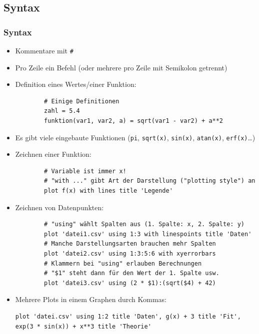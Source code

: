 \subsection{Syntax}

\begin{frame}[<+->][fragile]
	\frametitle{Syntax}
	\begin{itemize}
		\item Kommentare mit \lstinline|#|
		\item Pro Zeile ein Befehl (oder mehrere pro Zeile mit Semikolon getrennt)
		\item Definition eines Wertes/einer Funktion:
		\begin{lstlisting}
		# Einige Definitionen
		zahl = 5.4
		funktion(var1, var2, a) = sqrt(var1 - var2) + a**2
		\end{lstlisting}
		\item Es gibt viele eingebaute Funktionen (\lstinline|pi|, \lstinline|sqrt(x)|, \lstinline|sin(x)|, \lstinline|atan(x)|, \lstinline|erf(x)|…)
		\item Zeichnen einer Funktion:
		\begin{lstlisting}
		# Variable ist immer x!
		# "with ..." gibt Art der Darstellung ("plotting style") an
		plot f(x) with lines title 'Legende'
		\end{lstlisting}
	\end{itemize}
\end{frame}

\begin{frame}[<+->][fragile]
	\begin{itemize}
		\item Zeichnen von Datenpunkten:
		\begin{lstlisting}
		# "using" wählt Spalten aus (1. Spalte: x, 2. Spalte: y)
		plot 'datei1.csv' using 1:3 with linespoints title 'Daten'
		# Manche Darstellungsarten brauchen mehr Spalten
		plot 'datei2.csv' using 1:3:5:6 with xyerrorbars
		# Klammern bei "using" erlauben Berechnungen
		# "$1" steht dann für den Wert der 1. Spalte usw.
		plot 'datei3.csv' using (2 * $1):(sqrt($4) + 42)
		\end{lstlisting}
		
		\item Mehrere Plots in einem Graphen durch Kommas:
		\begin{lstlisting}[gobble=8]
		plot 'datei.csv' using 1:2 title 'Daten', g(x) + 3 title 'Fit', exp(3 * sin(x)) + x**3 title 'Theorie'
		\end{lstlisting}
	\end{itemize}
\end{frame}

